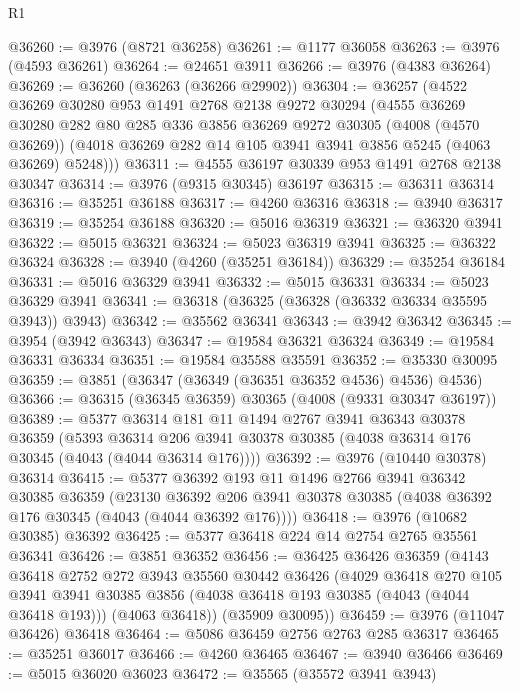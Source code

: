 \begin{lexlean}{R1}
\begin{coremodule}
@36260 := @3976 (@8721 @36258)
@36261 := @1177 @36058
@36263 := @3976 (@4593 @36261)
@36264 := @24651 @3911
@36266 := @3976 (@4383 @36264)
@36269 := @36260 (@36263 (@36266 @29902))
@36304 := @36257
    (@4522
      @36269
      @30280
      @953
      @1491
      @2768
      @2138
      @9272
      @30294
      (@4555
        @36269
        @30280
        @282
        @80
        @285
        @336
        @3856
        @36269
        @9272
        @30305
        (@4008 (@4570 @36269))
        (@4018 @36269 @282 @14 @105 @3941 @3941 @3856 @5245 (@4063 @36269) @5248)))
@36311 := @4555 @36197 @30339 @953 @1491 @2768 @2138 @30347
@36314 := @3976 (@9315 @30345) @36197
@36315 := @36311 @36314
@36316 := @35251 @36188
@36317 := @4260 @36316
@36318 := @3940 @36317
@36319 := @35254 @36188
@36320 := @5016 @36319
@36321 := @36320 @3941
@36322 := @5015 @36321
@36324 := @5023 @36319 @3941
@36325 := @36322 @36324
@36328 := @3940 (@4260 (@35251 @36184))
@36329 := @35254 @36184
@36331 := @5016 @36329 @3941
@36332 := @5015 @36331
@36334 := @5023 @36329 @3941
@36341 := @36318 (@36325 (@36328 (@36332 @36334 @35595 @3943)) @3943)
@36342 := @35562 @36341
@36343 := @3942 @36342
@36345 := @3954 (@3942 @36343)
@36347 := @19584 @36321 @36324
@36349 := @19584 @36331 @36334
@36351 := @19584 @35588 @35591
@36352 := @35330 @30095
@36359 := @3851 (@36347 (@36349 (@36351 @36352 @4536) @4536) @4536)
@36366 := @36315 (@36345 @36359) @30365 (@4008 (@9331 @30347 @36197))
@36389 := @5377
    @36314
    @181
    @11
    @1494
    @2767
    @3941
    @36343
    @30378
    @36359
    (@5393 @36314 @206 @3941 @30378 @30385 (@4038 @36314 @176 @30345 (@4043 (@4044 @36314 @176))))
@36392 := @3976 (@10440 @30378) @36314
@36415 := @5377
    @36392
    @193
    @11
    @1496
    @2766
    @3941
    @36342
    @30385
    @36359
    (@23130 @36392 @206 @3941 @30378 @30385 (@4038 @36392 @176 @30345 (@4043 (@4044 @36392 @176))))
@36418 := @3976 (@10682 @30385) @36392
@36425 := @5377 @36418 @224 @14 @2754 @2765 @35561 @36341
@36426 := @3851 @36352
@36456 := @36425
    @36426
    @36359
    (@4143
      @36418
      @2752
      @272
      @3943
      @35560
      @30442
      @36426
      (@4029
        @36418
        @270
        @105
        @3941
        @3941
        @30385
        @3856
        (@4038 @36418 @193 @30385 (@4043 (@4044 @36418 @193)))
        (@4063 @36418))
      (@35909 @30095))
@36459 := @3976 (@11047 @36426) @36418
@36464 := @5086 @36459 @2756 @2763 @285 @36317
@36465 := @35251 @36017
@36466 := @4260 @36465
@36467 := @3940 @36466
@36469 := @5015 @36020 @36023
@36472 := @35565 (@35572 @3941 @3943)

\end{coremodule}
\end{lexlean}
